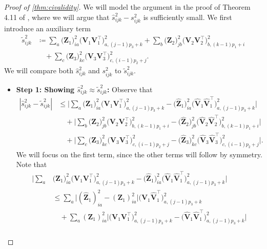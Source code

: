 \documentclass[10pt]{article}
\newcommand{\0}{{\mathbf{0}}}
\newcommand{\1}{{\mathbf{1}}}
\renewcommand{\citet}{\cite}
\renewcommand{\t}{^{\top}}
\renewcommand{\tilde}{\widetilde}
\renewcommand{\hat}{\widehat}
\renewcommand{\hat}{\widehat}
\begin{document}
\begin{proof}[Proof of \cref{thm:civalidity}]
We will model the argument in the proof of Theorem 4.11 of \citet{chen_spectral_2021}, where we will argue that $\hat s^2_{ijk} - s_{ijk}^2$ is sufficiently small.  We first introduce an auxiliary term
\begin{align*}
    \tilde s^2_{ijk} &\coloneqq \sum_{a} \big( \mathbf{Z}_1 \big)_{ia}^2 \big(\mathbf{V}_1 \mathbf{V}_1\t \big)_{a,(j-1)p_3+k}^2 +\sum_{b} \big( \mathbf{Z}_2 \big)^2_{jb} \big( \mathbf{V}_2 \mathbf{V}_2\t \big)_{b,(k-1)p_1 + i}^2  \\
    &\quad + \sum_c \big( \mathbf{Z}_3 \big)^2_{kc} \big( \mathbf{V}_3 \mathbf{V}_3\t \big)_{c,(i-1)p_2 + j}^2.
\end{align*}
We will compare both $\hat s^2_{ijk}$ and $s_{ijk}^2$ to $\tilde s^2_{ijk}$.
\begin{itemize}
    \item \textbf{Step 1: Showing $\hat s^2_{ijk} \approx \tilde s^2_{ijk}$:} 
Observe that
\begin{align*}
  | \hat s^2_{ijk} - \tilde s^2_{ijk} | &\leq \bigg|  \sum_{a} \big( \mathbf{Z}_1 \big)_{ia}^2 \big(\mathbf{V}_1 \mathbf{V}_1\t \big)_{a,(j-1)p_3+k}^2 -\big( \mathbf{\hat Z}_1 \big)_{ia}^2 \big(\mathbf{\hat V}_1 \mathbf{\hat V}_1\t \big)_{a,(j-1)p_3+k}^2 \bigg| \\
  &\quad + \bigg| \sum_{b} \big( \mathbf{Z}_2 \big)^2_{jb} \big( \mathbf{V}_2 \mathbf{V}_2\t \big)_{b,(k-1)p_1 + i}^2 -  \big( \mathbf{\hat Z}_2 \big)^2_{jb} \big( \mathbf{\hat V}_2 \mathbf{\hat V}_2\t \big)_{b,(k-1)p_1 + i}^2 \bigg|\\
  &\quad +\bigg|  \sum_c \big( \mathbf{Z}_3 \big)^2_{kc} \big( \mathbf{V}_3 \mathbf{V}_3\t \big)_{c,(i-1)p_2 + j}^2 - \big( \mathbf{\hat Z}_3 \big)^2_{kc} \big( \mathbf{\hat V}_3 \mathbf{\hat V}_3\t \big)_{c,(i-1)p_2 + j}^2 \bigg|.
\end{align*}
We will focus on the first term, since the other terms will follow by symmetry.  Note that
\begin{align}
    \bigg| \sum_{a} & \big( \mathbf{Z}_1 \big)_{ia}^2 \big(\mathbf{V}_1 \mathbf{V}_1\t \big)_{a,(j-1)p_3+k}^2 -\big( \mathbf{\hat Z}_1 \big)_{ia}^2 \big(\mathbf{\hat V}_1 \mathbf{\hat V}_1\t \big)_{a,(j-1)p_3+k}^2 \bigg| \nonumber\\
    &\leq \sum_{a} \big| (\mathbf{\hat Z}_1)_{ia}^2 - (\mathbf{Z}_1)_{ia}^2 \big| \big( \mathbf{\hat V}_1 \mathbf{\hat V}_1\t \big)_{a,(j-1)p_3 + k}^2 \\
    &\quad + \sum_a (\mathbf{Z}_1 )_{ia}^2 \bigg| \big(\mathbf{V}_1 \mathbf{V}_1\t\big)^2_{a,(j-1)p_3 + k} - \big(\mathbf{\hat V}_1 \mathbf{\hat V}_1\t\big)^2_{a,(j-1)p_3 + k} \bigg| \nonumber\\

\end{align}
\end{itemize}
\end{proof}
\end{document}
